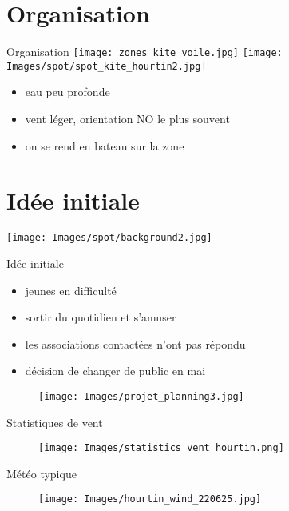 \documentclass[10pt,a4paper]{beamer}
\begin{document}
\section{Organisation}
\begin{frame}{Organisation}
\texttt{[image: zones\_kite\_voile.jpg]} 
\texttt{[image: Images/spot/spot\_kite\_hourtin2.jpg]} 
\begin{itemize}
\item eau peu profonde
\item vent léger, orientation NO le plus souvent
\item on se rend en bateau sur la zone
\end{itemize}
\end{frame}

\section{Idée initiale}
{
{
   \texttt{[image: Images/spot/background2.jpg]}
}
\begin{frame}{Idée initiale}
\begin{itemize}
\item  jeunes en difficulté
\item  sortir du quotidien et s'amuser
\item les associations contactées n'ont pas répondu
\item décision de changer de public en mai
\end{itemize}
\begin{figure}
\texttt{[image: Images/projet\_planning3.jpg]} 
\end{figure}
\end{frame}
}

\begin{frame}{Statistiques de vent}
\begin{figure}
\texttt{[image: Images/statistics\_vent\_hourtin.png]} 
\end{figure}
\end{frame}
\begin{frame}{Météo typique}
\begin{figure}
\texttt{[image: Images/hourtin\_wind\_220625.jpg]} 
\end{figure}
\end{frame}
\end{document}
